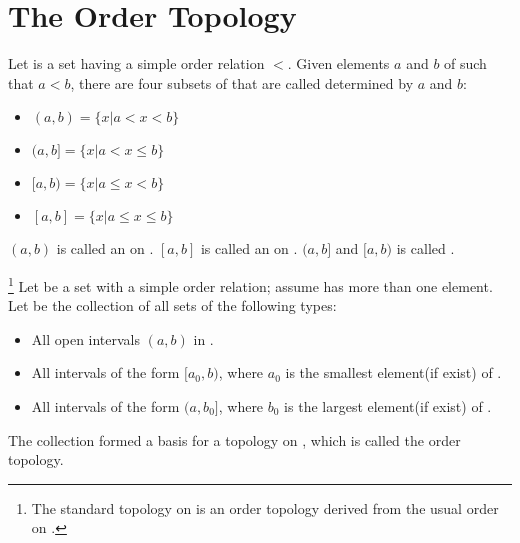 \section{The Order Topology}

\begin{definition}[interval]\label{def:Interval}
      Let  is a set having a simple order relation $ < $. Given elements $ a $ and $ b $ of  such that $ a < b $, there are four subsets of  that are called  determined by $ a $ and $ b $:
      \begin{itemize}
            \item $ (a,b) = \{ x | a < x < b \} $
            \item $ (a,b] = \{ x | a < x \le b \} $
            \item $ [a,b) = \{ x | a \le x < b \} $
            \item $ [a,b] = \{ x | a \le x \le b \} $
      \end{itemize}

      $ (a,b) $ is called an  on .
      $ [a,b] $ is called an  on .
      $ (a,b] $ and $ [a,b) $ is called .
\end{definition}

\begin{definition}\label{def:OrderTopology}\footnote{
      The standard topology on  is an order topology derived from the usual order on .
}
      Let  be a set with a simple order relation; assume  has more than one element. Let  be the collection of all sets of the following types:
      \begin{itemize}
            \item All open intervals $ (a,b) $ in .
            \item All intervals of the form $ [a_{0},b) $, where $ a_0 $ is the smallest element(if exist) of .
            \item All intervals of the form $ (a,b_{0}] $, where $ b_0 $ is the largest element(if exist) of .
      \end{itemize}

      The collection  formed a basis for a topology on , which is called the order topology.
\end{definition}

